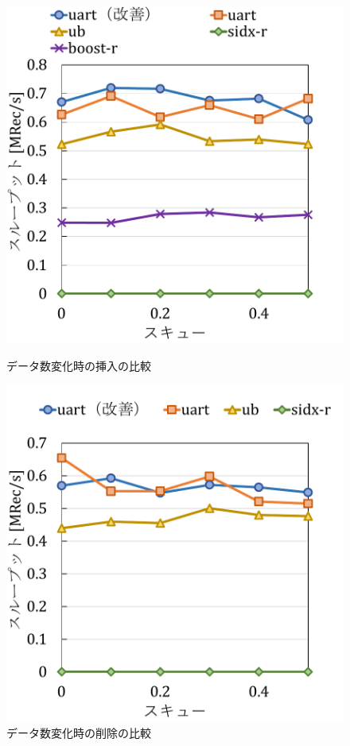 \begin{figure}[tb]
  \begin{minipage}[c]{0.495\textwidth}
    \centering
    \includegraphics[scale=0.5]{./figures/graph-skew-update-2.pdf}
    \caption{データ数変化時の挿入の比較}
    \label{graph:grouped}
  \end{minipage}
  \begin{minipage}[c]{0.495\textwidth}
    \centering
    \includegraphics[scale=0.5]{./figures/graph-skew-update-8.pdf}
    \caption{データ数変化時の削除の比較}
    \label{graph:paired}
  \end{minipage}
\end{figure}

